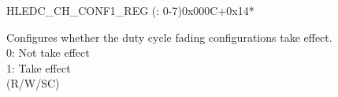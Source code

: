 \begin{register}{H}{LEDC\_CH\_CONF1\_REG (: 0-7)}{0x000C+0x14*}\label{regdesc:LEDCCHNCONF1REG}
%
%
\regnewline%
\begin{regdesc}\begin{reglist}
\label{fielddesc:LEDCDUTYSTARTCHN}\item [LEDC\_DUTY\_START\_CH\regindex{n}] Configures whether the duty cycle fading configurations take effect.\\
0: Not take effect\\
1: Take effect \\
(R/W/SC)
\end{reglist}\end{regdesc}
\end{register}


